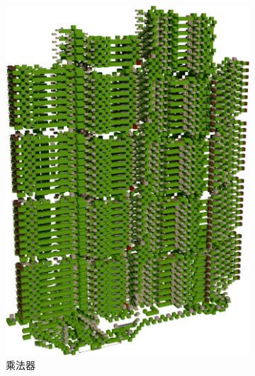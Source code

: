 \documentclass[UTF8,12pt,punct=kaiming,fontset=none]{ctexart}
\begin{document}
\begin{figure}[H]
    \centering
    \begin{subfigure}{3in}
        \label{fig7:a} %
        \includegraphics[width=\linewidth]{R4PTS.png}
        \caption{乘法器}
    \end{subfigure}
    \hspace{1in}%
    \begin{subfigure}{1.5in}
        \label{fig7:subfig:b} %

\end{subfigure}
\end{figure}
\end{document}
